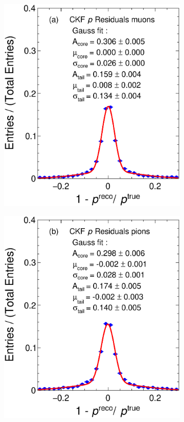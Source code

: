 \begin{figure}[t]
     \centering
     \begin{subfigure}{0.32\textwidth}
         \centering
         \includegraphics[width=\textwidth]{figures/ch5-KF_NDGAr/FullSample/Int/pRes/1D/Resp13.eps}
         \caption{}
         \label{fig:pResCKF13_Int}
     \end{subfigure}
     \begin{subfigure}{0.32\textwidth}
         \centering
         \includegraphics[width=\textwidth]{figures/ch5-KF_NDGAr/FullSample/Int/pRes/1D/Resp211.eps}

\end{subfigure}
\end{figure}

